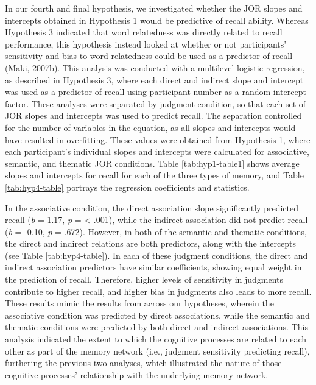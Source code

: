 \documentclass[english,,man]{apa6}
\begin{document}
In our fourth and final hypothesis, we investigated whether the JOR slopes and intercepts obtained in Hypothesis 1 would be predictive of recall ability. Whereas Hypothesis 3 indicated that word relatedness was directly related to recall performance, this hypothesis instead looked at whether or not participants' sensitivity and bias to word relatedness could be used as a predictor of recall (Maki, 2007b). This analysis was conducted with a multilevel logistic regression, as described in Hypothesis 3, where each direct and indirect slope and intercept was used as a predictor of recall using participant number as a random intercept factor. These analyses were separated by judgment condition, so that each set of JOR slopes and intercepts was used to predict recall. The separation controlled for the number of variables in the equation, as all slopes and intercepts would have resulted in overfitting. These values were obtained from Hypothesis 1, where each participant's individual slopes and intercepts were calculated for associative, semantic, and thematic JOR conditions. Table \ref{tab:hyp1-table1} shows average slopes and intercepts for recall for each of the three types of memory, and Table \ref{tab:hyp4-table} portrays the regression coefficients and statistics.

In the associative condition, the direct association slope significantly predicted recall (\emph{b} = 1.17, \emph{p} = \textless{} .001), while the indirect association did not predict recall (\emph{b} = -0.10, \emph{p} = .672). However, in both of the semantic and thematic conditions, the direct and indirect relations are both predictors, along with the intercepts (see Table \ref{tab:hyp4-table}). In each of these judgment conditions, the direct and indirect association predictors have similar coefficients, showing equal weight in the prediction of recall. Therefore, higher levels of sensitivity in judgments contribute to higher recall, and higher bias in judgments also leads to more recall. These results mimic the results from across our hypotheses, wherein the associative condition was predicted by direct associations, while the semantic and thematic conditions were predicted by both direct and indirect associations. This analysis indicated the extent to which the cognitive processes are related to each other as part of the memory network (i.e., judgment sensitivity predicting recall), furthering the previous two analyses, which illustrated the nature of those cognitive processes' relationship with the underlying memory network.
\end{document}
